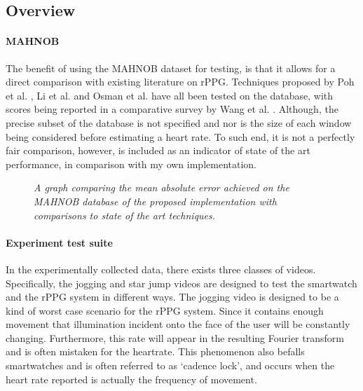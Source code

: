 \begin{figure}[H]
    \subfloat[]{\scalebox{0.6}{}}
    \qquad
    \subfloat[]{\scalebox{0.6}{}}
\end{figure}

\subsection{Overview}



\paragraph{MAHNOB}
The benefit of using the MAHNOB dataset for testing, is that it allows for a direct comparison with existing literature on rPPG.
Techniques proposed by Poh et al. \cite{poh}, Li et al. \cite{li} and Osman et al. \cite{osman} have all been tested on the database, with 
scores being reported in a comparative survey by Wang et al. \cite{comparative}.
Although, the precise subset of the database is not specified and nor is the size of each window being considered before estimating a heart rate.
To such end, it is not a perfectly fair comparison, however, is included as an indicator of state of the art performance, in comparison with my own implementation.

\begin{figure}
    \centering
    \scalebox{0.6}{}
   \caption{\textit{A graph comparing the mean absolute error achieved on the MAHNOB database of the proposed implementation with comparisons to state of the art techniques.}}
\end{figure}
\paragraph{Experiment test suite}
In the experimentally collected data, there exists three classes of videos. Specifically, the jogging and star jump videos are designed to test the smartwatch and 
the rPPG system in different ways. The jogging video is designed to be a kind of worst case scenario for the rPPG system. Since it contains enough movement that
illumination incident onto the face of the user will be constantly changing. Furthermore, this rate will appear in the resulting Fourier transform and is often mistaken
for the heartrate. This phenomenon also befalls smartwatches and is often referred to as `cadence lock', and occurs when the heart rate reported is actually the frequency 
of movement.

